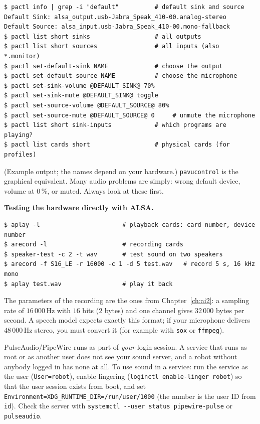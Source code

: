 \begin{verbatim}
$ pactl info | grep -i "default"          # default sink and source
Default Sink: alsa_output.usb-Jabra_Speak_410-00.analog-stereo
Default Source: alsa_input.usb-Jabra_Speak_410-00.mono-fallback
$ pactl list short sinks                  # all outputs
$ pactl list short sources                # all inputs (also *.monitor)
$ pactl set-default-sink NAME             # choose the output
$ pactl set-default-source NAME           # choose the microphone
$ pactl set-sink-volume @DEFAULT_SINK@ 70%
$ pactl set-sink-mute @DEFAULT_SINK@ toggle
$ pactl set-source-volume @DEFAULT_SOURCE@ 80%
$ pactl set-source-mute @DEFAULT_SOURCE@ 0     # unmute the microphone
$ pactl list short sink-inputs            # which programs are playing?
$ pactl list cards short                  # physical cards (for profiles)
\end{verbatim}
(Example output; the names depend on your hardware.) \texttt{pavucontrol} is the graphical equivalent. Many audio problems are simply: wrong default device, volume at $0\,\%$, or muted. Always look at these first.

\textbf{Testing the hardware directly with ALSA.}
\begin{verbatim}
$ aplay -l                       # playback cards: card number, device number
$ arecord -l                     # recording cards
$ speaker-test -c 2 -t wav       # test sound on two speakers
$ arecord -f S16_LE -r 16000 -c 1 -d 5 test.wav   # record 5 s, 16 kHz mono
$ aplay test.wav                 # play it back
\end{verbatim}
The parameters of the recording are the ones from Chapter~\ref{ch:ai2}: a sampling rate of $16\,000$\,Hz with $16$ bits ($2$ bytes) and one channel gives $32\,000$ bytes per second. A speech model expects exactly this format; if your microphone delivers $48\,000$\,Hz stereo, you must convert it (for example with \texttt{sox} or \texttt{ffmpeg}).

\begin{keyidea}
PulseAudio/PipeWire runs as part of \emph{your} login session. A service that runs as root or as another user does not see your sound server, and a robot without anybody logged in has none at all. To use sound in a service: run the service as the user (\texttt{User=robot}), enable lingering (\verb|loginctl enable-linger robot|) so that the user session exists from boot, and set \texttt{Environment=XDG\_RUNTIME\_DIR=/run/user/1000} (the number is the user ID from \texttt{id}). Check the server with \verb|systemctl --user status pipewire-pulse| or \texttt{pulseaudio}.
\end{keyidea}

